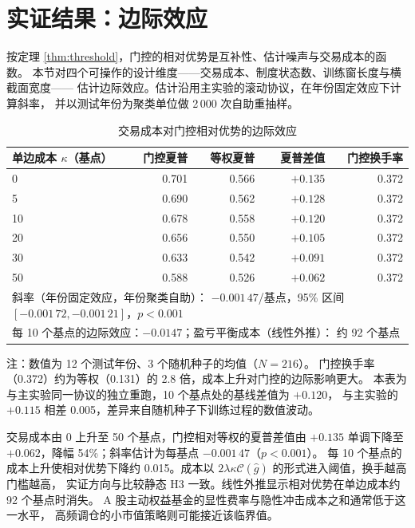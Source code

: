 \section{实证结果：边际效应}
\label{sec:marginal}

按定理 \ref{thm:threshold}，门控的相对优势是互补性、估计噪声与交易成本的函数。
本节对四个可操作的设计维度——交易成本、制度状态数、训练窗长度与横截面宽度——
估计边际效应。估计沿用主实验的滚动协议，在年份固定效应下计算斜率，
并以测试年份为聚类单位做 2\,000 次自助重抽样。

\begin{table}[htbp]
\centering
\caption{交易成本对门控相对优势的边际效应}
\label{tab:cost}
\begin{threeparttable}
\footnotesize
\begin{tabular}{lrrrr}
\toprule
单边成本 $\kappa$（基点） & 门控夏普 & 等权夏普 & 夏普差值 & 门控换手率 \\
\midrule
0 & 0.701 & 0.566 & $+0.135$ & 0.372 \\
5 & 0.690 & 0.562 & $+0.128$ & 0.372 \\
10 & 0.678 & 0.558 & $+0.120$ & 0.372 \\
20 & 0.656 & 0.550 & $+0.105$ & 0.372 \\
30 & 0.633 & 0.542 & $+0.091$ & 0.372 \\
50 & 0.588 & 0.526 & $+0.062$ & 0.372 \\
\midrule
\multicolumn{5}{l}{斜率（年份固定效应，年份聚类自助）：
$-0.001\,47$/基点，95\% 区间 $[-0.001\,72,-0.001\,21]$，$p<0.001$} \\
\multicolumn{5}{l}{每 10 个基点的边际效应：$-0.0147$；盈亏平衡成本（线性外推）：
约 92 个基点} \\
\bottomrule
\end{tabular}
\begin{tablenotes}[flushleft]\footnotesize
\item 注：数值为 12 个测试年份、3 个随机种子的均值（$N=216$）。
门控换手率（0.372）约为等权（0.131）的 2.8 倍，成本上升对门控的边际影响更大。
本表为与主实验同一协议的独立重跑，10 个基点处的基线差值为 $+0.120$，
与主实验的 $+0.115$ 相差 0.005，差异来自随机种子下训练过程的数值波动。
\end{tablenotes}
\end{threeparttable}
\end{table}

交易成本由 0 上升至 50 个基点，门控相对等权的夏普差值由 $+0.135$ 单调下降至
$+0.062$，降幅 54\%；斜率估计为每基点 $-0.001\,47$（$p<0.001$）。
每 10 个基点的成本上升使相对优势下降约 0.015。成本以
$2\lambda\kappa\mathcal{C}(\hat g)$ 的形式进入阈值，换手越高门槛越高，
实证方向与比较静态 H3 一致。线性外推显示相对优势在单边成本约 92 个基点时消失。
A 股主动权益基金的显性费率与隐性冲击成本之和通常低于这一水平，
高频调仓的小市值策略则可能接近该临界值。

